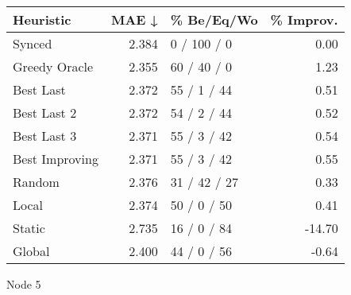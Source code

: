 \begin{tabular}{lrlr}
\toprule
\textbf{Heuristic} & \textbf{MAE ↓} & \textbf{\% Be/Eq/Wo} & \textbf{\% Improv.} \\
\midrule
            Synced &          2.384 &          0 / 100 / 0 &                0.00 \\
     Greedy Oracle &          2.355 &          60 / 40 / 0 &                1.23 \\
         Best Last &          2.372 &          55 / 1 / 44 &                0.51 \\
       Best Last 2 &          2.372 &          54 / 2 / 44 &                0.52 \\
       Best Last 3 &          2.371 &          55 / 3 / 42 &                0.54 \\
    Best Improving &          2.371 &          55 / 3 / 42 &                0.55 \\
            Random &          2.376 &         31 / 42 / 27 &                0.33 \\
             Local &          2.374 &          50 / 0 / 50 &                0.41 \\
            Static &          2.735 &          16 / 0 / 84 &              -14.70 \\
            Global &          2.400 &          44 / 0 / 56 &               -0.64 \\
\bottomrule
\end{tabular}
\caption{Node 5}
\label{tab:ds_iid_lr01_le2_bs4_5}
